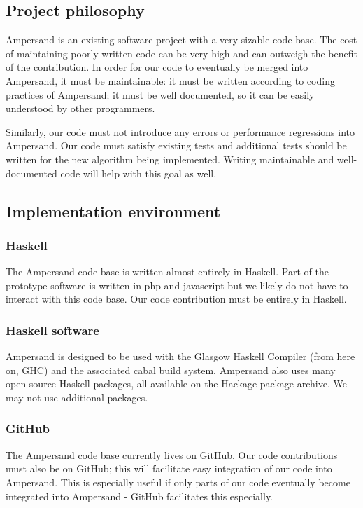 \documentclass[12pt]{report}
\begin{document}
\subsection{Project philosophy}

Ampersand is an existing software project with a very sizable code base. The
cost of maintaining poorly-written code can be very high and can outweigh the
benefit of the contribution. In order for our code to eventually be merged into
Ampersand, it must be maintainable: it must be written according to coding
practices of Ampersand; it must be well documented, so it can be easily
understood by other programmers. 

Similarly, our code must not introduce any errors or performance regressions
into Ampersand. Our code must satisfy existing tests and additional tests should
be written for the new algorithm being implemented. Writing maintainable and
well-documented code will help with this goal as well.


\subsection{Implementation environment}
\subsubsection*{Haskell}
The Ampersand code base is written almost entirely in Haskell. Part of the
prototype software is written in php and javascript %
but we likely do not have to interact with this code base. Our code contribution
must be entirely in Haskell.

\subsubsection*{Haskell software}
Ampersand is designed to be used with the Glasgow Haskell Compiler (from here on, GHC) %
and the associated cabal build system. %
Ampersand also uses many open source Haskell packages, all available on the
Hackage package archive. %
We may not use additional packages. %


\subsubsection*{GitHub}
The Ampersand code base currently lives on GitHub. Our code contributions must
also be on GitHub; this will facilitate easy integration of our code into
Ampersand. This is especially useful if only parts of our code eventually become
integrated into Ampersand - GitHub facilitates this especially. 
%
\end{document}

